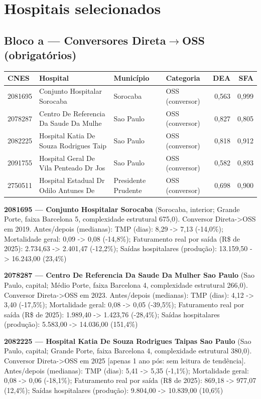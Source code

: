 \documentclass[12pt,a4paper]{article}
\begin{document}
\section{Hospitais selecionados}
\label{sec:selecao}

\subsection{Bloco a --- Conversores Direta$\to$OSS (obrigatórios)}
\begin{center}\small
\begin{tabular}{llllrr}
\toprule
CNES & Hospital & Município & Categoria & DEA & SFA \\
\midrule
2081695 & Conjunto Hospitalar Sorocaba & Sorocaba & OSS (conversor) & 0,563 & 0,999 \\
2078287 & Centro De Referencia Da Saude Da Mulhe & Sao Paulo & OSS (conversor) & 0,827 & 0,805 \\
2082225 & Hospital Katia De Souza Rodrigues Taip & Sao Paulo & OSS (conversor) & 0,818 & 0,912 \\
2091755 & Hospital Geral De Vila Penteado Dr Jos & Sao Paulo & OSS (conversor) & 0,582 & 0,893 \\
2750511 & Hospital Estadual Dr Odilo Antunes De  & Presidente Prudente & OSS (conversor) & 0,698 & 0,900 \\
\bottomrule
\end{tabular}
\end{center}
\noindent\textbf{2081695 --- Conjunto Hospitalar Sorocaba} (Sorocaba, interior; Grande Porte, faixa Barcelona 5, complexidade estrutural 675,0). Conversor Direta->OSS em 2019. Antes/depois (medianas): TMP (dias): 8,29 -> 7,13 (-14,0\%); Mortalidade geral: 0,09 -> 0,08 (-14,8\%); Faturamento real por saída (R\$ de 2025): 2.734,63 -> 2.401,47 (-12,2\%); Saídas hospitalares (produção): 13.159,50 -> 16.243,00 (23,4\%)\par\medskip
\noindent\textbf{2078287 --- Centro De Referencia Da Saude Da Mulher Sao Paulo} (Sao Paulo, capital; Médio Porte, faixa Barcelona 4, complexidade estrutural 266,0). Conversor Direta->OSS em 2023. Antes/depois (medianas): TMP (dias): 4,12 -> 3,40 (-17,5\%); Mortalidade geral: 0,08 -> 0,05 (-39,5\%); Faturamento real por saída (R\$ de 2025): 1.989,40 -> 1.423,76 (-28,4\%); Saídas hospitalares (produção): 5.583,00 -> 14.036,00 (151,4\%)\par\medskip
\noindent\textbf{2082225 --- Hospital Katia De Souza Rodrigues Taipas Sao Paulo} (Sao Paulo, capital; Grande Porte, faixa Barcelona 4, complexidade estrutural 380,0). Conversor Direta->OSS em 2025 [apenas 1 ano pós: sem leitura de tendência]. Antes/depois (medianas): TMP (dias): 5,41 -> 5,35 (-1,1\%); Mortalidade geral: 0,08 -> 0,06 (-18,1\%); Faturamento real por saída (R\$ de 2025): 869,18 -> 977,07 (12,4\%); Saídas hospitalares (produção): 9.804,00 -> 10.839,00 (10,6\%)\par\medskip
\end{document}
